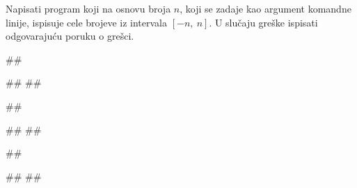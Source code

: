  
\begin{Exercise}[label=p2.6_04] 
 Napisati program koji na osnovu broja $n$, koji se zadaje kao argument komandne 
 linije, ispisuje cele brojeve iz intervala $[-n,\ n]$.
 U slučaju greške ispisati odgovarajuću poruku o grešci.
 
\begin{minitest}
\begin{upotreba}{1}
##

#\naslovIzlaz#
##
\end{upotreba}
\end{minitest}
\begin{minitest}
\begin{upotreba}{2}
##

#\naslovIzlaz#
##
\end{upotreba}
\end{minitest}
\begin{minitest}
\begin{upotreba}{3}
##

#\naslovIzlaz#
##
\end{upotreba}
\end{minitest}

\end{Exercise}
\ifresenja
\begin{Answer}[ref=p2.6_04]
\end{Answer}
 \fi 
 

